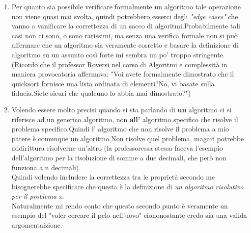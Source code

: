\documentclass[a4paper]{article}
\begin{document}
\begin{enumerate}
	\item Per quanto sia possibile verificare formalmente un algoritmo tale operazione non viene quasi mai svolta, quindi potrebbero esserci degli \textit{"edge cases"} che vanno a vanificare la correttezza di un sacco di algoritmi.Probabilmente tali casi non ci sono, o sono rarissimi, ma senza una verifica formale non si può affermare che un algoritmo sia veramente corretto e basare la definizione di algoritmo su un assunto così forte mi sembra un po' troppo stringente.
		(Ricordo che il professor Roversi nel corso di Algoritmi e complessità in maniera provocatoria affermava: "Voi avete formalmente dimostrato che il quicksort fornisce una lista ordinata di elementi?No, vi basate sulla fiducia.Siete sicuri che qualcuno lo abbia mai dimostrato?")
	\item Volendo essere molto precisi quando si sta parlando di \textbf{un} algoritmo ci si riferisce ad un generico algoritmo, non \textbf{all'} algoritmo specifico che risolve il problema specifico.Quindi l' algoritmo che non risolve il problema a mio parere è comunque un algoritmo.Non risolve quel problema, magari potrebbe addirittura risolverne un'altro (la professoressa stessa faceva l'esempio dell'algoritmo per la risoluzione di somme a due decimali, che però non funziona a n decimali).\\
		Quindi volendo includere la correttezza tra le proprietà secondo me bisognerebbe specificare che questa è la definizione di \textit{un algoritmo risolutivo per il problema x}.\\
	Naturalmente mi rendo conto che questo secondo punto è veramente un esempio del "voler cercare il pelo nell'uovo" ciononostante credo sia una valida argomentaizione. 
\end{enumerate}
\end{document}
